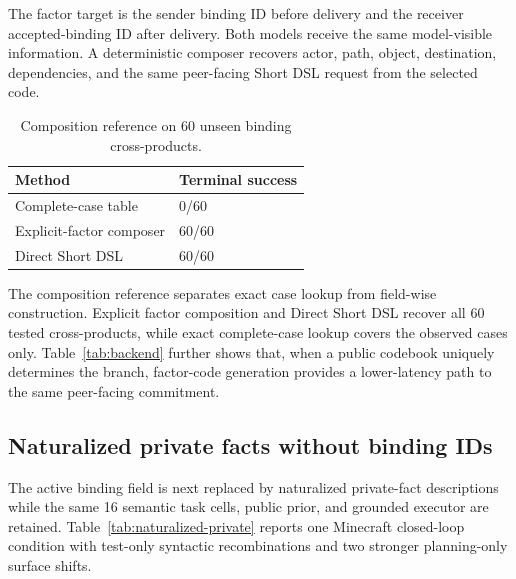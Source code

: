 \documentclass[10pt]{article}
\newcommand{\tabstyle}{\small\setlength{\tabcolsep}{2.5pt}\renewcommand{\arraystretch}{1.10}}
\newcommand{\thead}[1]{\textbf{#1}}
\begin{document}
The factor target is the sender binding ID before delivery and the receiver accepted-binding ID after delivery. Both models receive the same model-visible information. A deterministic composer recovers actor, path, object, destination, dependencies, and the same peer-facing Short DSL request from the selected code.

\begin{table}[!htbp]
  \centering
  \caption{Composition reference on 60 unseen binding cross-products.}
  \label{tab:factor-minimality}
  \tabstyle
  \begin{tabularx}{\textwidth}{Z R{2.30cm}}
    \toprule
    \thead{Method} & \thead{Terminal success} \\
    \midrule
    Complete-case table & 0/60 \\
    Explicit-factor composer & 60/60 \\
    Direct Short DSL & 60/60 \\
    \bottomrule
  \end{tabularx}
\end{table}

The composition reference separates exact case lookup from field-wise construction. Explicit factor composition and Direct Short DSL recover all 60 tested cross-products, while exact complete-case lookup covers the observed cases only. Table~\ref{tab:backend} further shows that, when a public codebook uniquely determines the branch, factor-code generation provides a lower-latency path to the same peer-facing commitment.

\subsection{Naturalized private facts without binding IDs}

The active binding field is next replaced by naturalized private-fact descriptions while the same 16 semantic task cells, public prior, and grounded executor are retained. Table~\ref{tab:naturalized-private} reports one Minecraft closed-loop condition with test-only syntactic recombinations and two stronger planning-only surface shifts.
\end{document}
